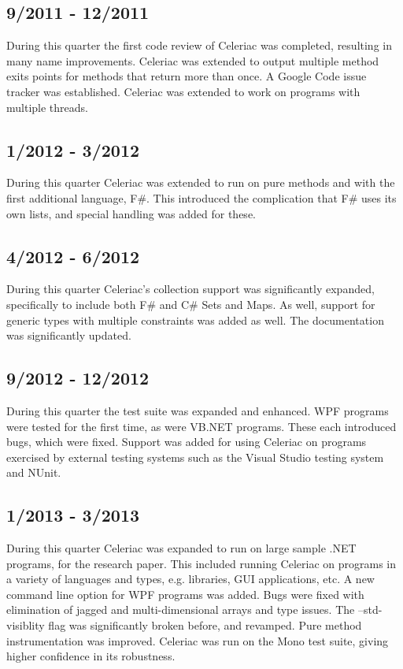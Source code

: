 \documentclass{article}
\begin{document}
\subsection{9/2011 - 12/2011}
During this quarter the first code review of Celeriac was completed, resulting in many name improvements. Celeriac was extended to output multiple method exits points for methods that return more than once. A Google Code issue tracker was established. Celeriac was extended to work on programs with multiple threads.

\subsection{1/2012 - 3/2012}
During this quarter Celeriac was extended to run on pure methods and with the first additional language, F\#. This introduced the complication that F\# uses its own lists, and special handling was added for these.

\subsection{4/2012 - 6/2012}
During this quarter Celeriac's collection support was significantly expanded, specifically to include both F\# and C\# Sets and Maps. As well, support for generic types with multiple constraints was added as well. The documentation was significantly updated.

\subsection{9/2012 - 12/2012}
During this quarter the test suite was expanded and enhanced. WPF programs were tested for the first time, as were VB.NET programs. These each introduced bugs, which were fixed. Support was added for using Celeriac on programs exercised by external testing systems such as the Visual Studio testing system and NUnit.

\subsection{1/2013 - 3/2013}
During this quarter Celeriac was expanded to run on large sample .NET programs, for the research paper. This included running Celeriac on programs in a variety of languages and types, e.g. libraries, GUI applications, etc. A new command line option for WPF programs was added. Bugs were fixed with elimination of jagged and multi-dimensional arrays and type issues. The --std-visiblity flag was significantly broken before, and revamped. Pure method instrumentation was improved. Celeriac was run on the Mono test suite, giving higher confidence in its robustness.
\end{document}
